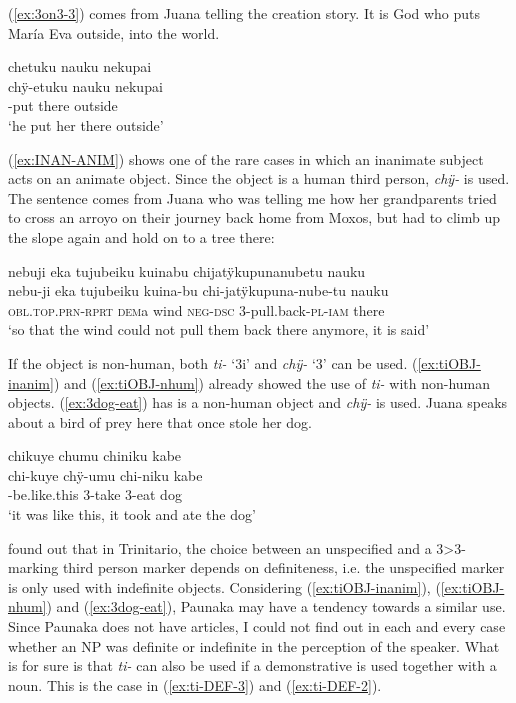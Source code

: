 (\ref{ex:3on3-3}) comes from Juana telling the creation story. It is God who puts María Eva outside, into the world.

\ea\label{ex:3on3-3}
\begingl 
\glpreamble chetuku nauku nekupai\\
\gla chÿ-etuku nauku nekupai\\ 
-put there outside\\ 
\glft ‘he put her there outside’\\ 
\endgl
\trailingcitation{[jxx-n101013s-1.359]}
\xe

(\ref{ex:INAN-ANIM}) shows one of the rare cases in which an inanimate subject acts on an animate object. Since the object is a human third person, \textit{chÿ-} is used. The sentence comes from Juana who was telling me how her grandparents tried to cross an arroyo on their journey back home from Moxos, but had to climb up the slope again and hold on to a tree there:
 
 \ea\label{ex:INAN-ANIM}
\begingl 
\glpreamble nebuji eka tujubeiku kuinabu chijatÿkupunanubetu nauku\\
\gla nebu-ji eka tujubeiku kuina-bu chi-jatÿkupuna-nube-tu nauku\\ 
\textsc{obl.top.prn}-\textsc{rprt} \textsc{dem}a wind \textsc{neg}-\textsc{dsc} 3-pull.back-\textsc{pl}-\textsc{iam} there\\ 
\glft ‘so that the wind could not pull them back there anymore, it is said’\\ 
\endgl
\trailingcitation{[jxx-p151016l-2.120-121]}
\xe
{}

If the object is non-human, both \textit{ti-} ‘3i’ and \textit{chÿ-} ‘3’ can be used. (\ref{ex:tiOBJ-inanim}) and (\ref{ex:tiOBJ-nhum}) already showed the use of \textit{ti-} with non-human objects. (\ref{ex:3dog-eat}) has is a non-human object and \textit{chÿ-} is used. Juana speaks about a bird of prey here that once stole her dog.

\ea\label{ex:3dog-eat}
\begingl
\glpreamble chikuye chumu chiniku kabe\\
\gla chi-kuye chÿ-umu chi-niku kabe\\
-be.like.this 3-take 3-eat dog\\
\glft ‘it was like this, it took and ate the dog’
\endgl
\trailingcitation{[jxx-a120516l-a.199]}
\xe{}

\citet[480]{Rose2011a} found out that in Trinitario, the choice between an unspecified and a 3>3-marking third person marker depends on definiteness, i.e. the unspecified marker is only used with indefinite objects. Considering (\ref{ex:tiOBJ-inanim}), (\ref{ex:tiOBJ-nhum}) and (\ref{ex:3dog-eat}), Paunaka may have a tendency towards a similar use. Since Paunaka does not have articles, I could not find out in each and every case whether an NP was definite or indefinite in the perception of the speaker. What is for sure is that \textit{ti-} can also be used if a demonstrative is used together with a noun. This is the case in (\ref{ex:ti-DEF-3}) and (\ref{ex:ti-DEF-2}).

